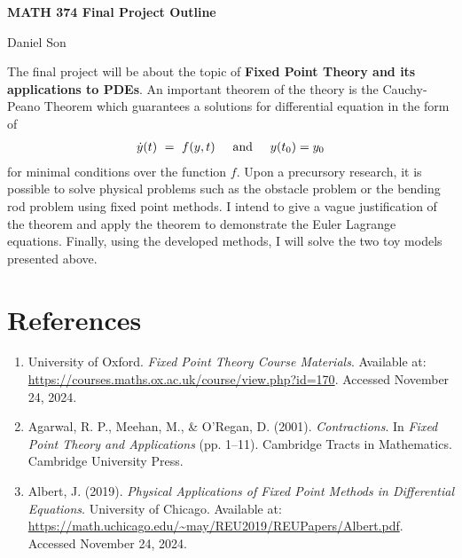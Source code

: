 \documentclass{article}
\numberwithin{equation}{section}
\newcommand{\textAnd}{
    {
        \hspace{5mm}
        \textrm{and}
        \hspace{5mm}
    }
}
\begin{document}
\begin{center}
    \Large
    \textbf{MATH 374 Final Project Outline}

    \large
    Daniel Son
\end{center}

The final project will be about the topic of \textbf{Fixed Point Theory and its applications to PDEs}. An important 
theorem of the theory is the Cauchy-Peano Theorem which guarantees a solutions for differential equation in the form of 
\begin{align}
    \dot y(t) \ = \ f(y, t) \textAnd y(t_0) = y_0
\end{align}
for minimal conditions over the function $f$. Upon a precursory research, 
it is possible to solve physical problems such as the obstacle problem 
or the bending rod problem using fixed point methods. I intend to give 
a vague justification of the theorem and apply the theorem to demonstrate 
the Euler Lagrange equations. Finally, using the developed methods, 
I will solve the two toy models presented above. 

\section*{References}

\begin{enumerate}
    \item University of Oxford. \emph{Fixed Point Theory Course Materials}. Available at: \url{https://courses.maths.ox.ac.uk/course/view.php?id=170}. Accessed November 24, 2024.
    \item Agarwal, R. P., Meehan, M., \& O’Regan, D. (2001). \emph{Contractions}. In \emph{Fixed Point Theory and Applications} (pp. 1–11). Cambridge Tracts in Mathematics. Cambridge University Press.
    \item Albert, J. (2019). \emph{Physical Applications of Fixed Point Methods in Differential Equations}. University of Chicago. Available at: \url{https://math.uchicago.edu/~may/REU2019/REUPapers/Albert.pdf}. Accessed November 24, 2024.
\end{enumerate}
\end{document}
